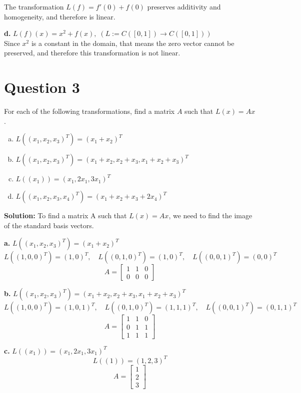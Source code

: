 \documentclass{article}
\begin{document}
\noindent The transformation $L(f) = f'(0) + f(0)$ preserves additivity and homogeneity, and therefore is linear.

\vspace{0.25cm}
\noindent\textbf{d.} $ L(f)(x) = x^2 + f(x), \; (L := C([0,1]) \to C([0,1])) $ \\
Since $x^2$ is a constant in the domain, that means the zero vector cannot be preserved, and therefore this transformation is not linear.


\section*{Question 3}
For each of the following transformations, find a matrix $A$ such that $L(x) = Ax$.
\begin{enumerate}[a.]
    \item $ L((x_1, x_2, x_3)^T) = (x_1 + x_2)^T $
    \item $ L((x_1, x_2, x_3)^T) = (x_1 + x_2, x_2 + x_3, x_1 + x_2 + x_3)^T $
    \item $ L((x_1)) = (x_1, 2x_1, 3x_1)^T $
    \item $ L((x_1, x_2, x_3, x_4)^T) = (x_1 + x_2 + x_3 + 2x_4)^T $
\end{enumerate}

\noindent\textbf{Solution:} To find a matrix A such that $L(x) = Ax$, we need to find the image of the standard basis vectors.

\vspace{0.25cm}
\noindent\textbf{a.} $ L((x_1, x_2, x_3)^T) = (x_1 + x_2)^T $ \\
$$ L((1, 0, 0)^T) = (1, 0)^T, \quad L((0, 1, 0)^T) = (1, 0)^T, \quad L((0, 0, 1)^T) = (0, 0)^T $$
$$ A = \begin{bmatrix} 1 & 1 & 0 \\ 0 & 0 & 0 \end{bmatrix} $$

\vspace{0.25cm}
\noindent\textbf{b.} $ L((x_1, x_2, x_3)^T) = (x_1 + x_2, x_2 + x_3, x_1 + x_2 + x_3)^T $ \\
$$ L((1, 0, 0)^T) = (1, 0, 1)^T, \quad L((0, 1, 0)^T) = (1, 1, 1)^T, \quad L((0, 0, 1)^T) = (0, 1, 1)^T $$
$$ A = \begin{bmatrix} 1 & 1 & 0 \\ 0 & 1 & 1 \\ 1 & 1 & 1 \end{bmatrix} $$

\vspace{0.25cm}
\noindent\textbf{c.} $ L((x_1)) = (x_1, 2x_1, 3x_1)^T $ \\
$$ L((1)) = (1, 2, 3)^T $$
$$ A = \begin{bmatrix} 1 \\ 2 \\ 3 \end{bmatrix} $$
\end{document}
